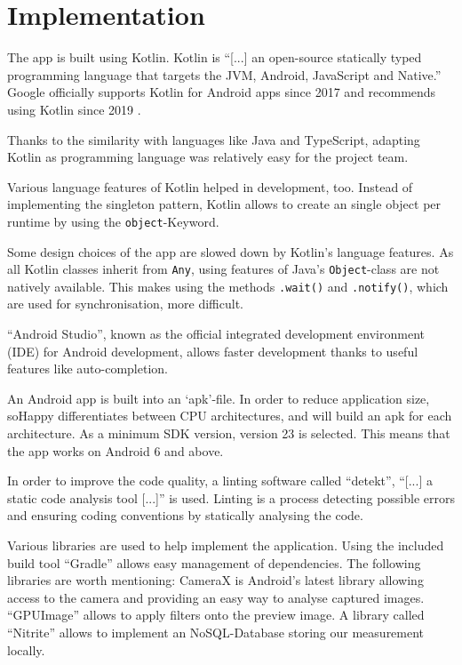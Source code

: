 \section{Implementation} \label{sec:implementation}

The app is built using Kotlin. Kotlin is ``[...] an open-source statically 
typed programming language that targets the JVM, Android, JavaScript and 
Native.'' \cite{kotlin2020}
Google officially supports Kotlin for Android apps since 2017
\cite{googleio2017} and recommends using Kotlin since 2019
\cite{androidkotlin2019}.

Thanks to the similarity with languages like Java and TypeScript, adapting
Kotlin as programming language was relatively easy for the project team.

Various language features of Kotlin helped in development, too. Instead of
implementing the singleton pattern, Kotlin allows to create an single object
per runtime by using the \texttt{object}-Keyword.

Some design choices of the app are slowed down by Kotlin's language features.
As all Kotlin classes inherit from \texttt{Any}, using features of Java's 
\texttt{Object}-class are not natively available. This makes using the methods
\texttt{.wait()} and \texttt{.notify()}, which are used for synchronisation,
more difficult.

``Android Studio'', known as the official integrated development environment 
(IDE) for Android development, allows faster development thanks to useful
features like auto-completion. 

An Android app is built into an `apk'-file. In order to reduce application
size, soHappy differentiates between CPU architectures, and will
build an apk for each architecture. As a minimum SDK version, version 23
is selected. This means that the app works on Android 6 and above.

In order to improve the code quality, a linting software called ``detekt'',
``[...] a static code analysis tool [...]''\cite{detekt2020} is used.
Linting is a process detecting possible errors and ensuring coding conventions
by statically analysing the code.

Various libraries are used to help implement the application. Using
the included build tool ``Gradle'' \cite{gradle} allows easy management of 
dependencies. The following libraries are worth mentioning: CameraX 
\cite{camerax} is Android's latest library allowing access to the camera and 
providing an easy way to analyse captured images. ``GPUImage'' \cite{gpuimage}
allows to apply filters onto the preview image. A library called ``Nitrite''
\cite{nitrite} allows to implement an NoSQL-Database storing our measurement 
locally.

